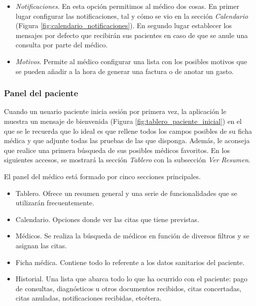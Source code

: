 \begin{itemize}
			\item \textit{Notificaciones}. En esta opción permitimos al médico dos cosas. En primer lugar configurar las notificaciones, tal y cómo se vio en la sección \textit{Calendario} (Figura \ref{fig:calendario_notificaciones}). En segundo lugar establecer los mensajes por defecto que recibirán sus pacientes en caso de que se anule una consulta por parte del médico.
			
			\item \textit{Motivos}. Permite al médico configurar una lista con los posibles motivos que se pueden añadir a la hora de generar una factura o de anotar un gasto.
			
		\end{itemize}
				
		
	
	\bigskip
	\subsubsection{Panel del paciente} %
		\label{sub:panel_paciente}
	
		Cuando un usuario paciente inicia sesión por primera vez, la aplicación le muestra un mensaje de bienvenida (Figura \ref{fig:tablero_paciente_inicial}) en el que se le recuerda que lo ideal es que rellene todos los campos posibles de su ficha médica y que adjunte todas las pruebas de las que disponga. Además, le aconseja que realice una primera búsqueda de sus posibles médicos favoritos. En los siguientes accesos, se mostrará la sección \textit{Tablero} con la subsección \textit{Ver Resumen}.		
	
		El panel del médico está formado por cinco secciones principales.
		\begin{itemize}
			\item Tablero. Ofrece un resumen general y una serie de funcionalidades que se utilizarán frecuentemente.
			\item Calendario. Opciones donde ver las citas que tiene previstas.
			\item Médicos. Se realiza la búsqueda de médicos en función de diversos filtros y se asignan las citas.
			\item Ficha médica. Contiene todo lo referente a los datos sanitarios del paciente.
			\item Historial. Una lista que abarca todo lo que ha ocurrido con el paciente: pago de consultas, diagnósticos u otros documentos recibidos, citas concertadas, citas anuladas, notificaciones recibidas, etcétera. 
		\end{itemize}
		
